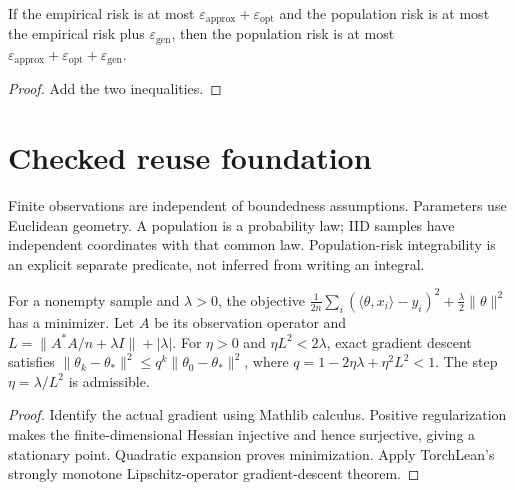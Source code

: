 \begin{lemma}\label{lem:population_risk}
\leanok
{}
If the empirical risk is at most $\varepsilon_{\mathrm{approx}}+\varepsilon_{\mathrm{opt}}$ and the population risk is at most the empirical risk plus $\varepsilon_{\mathrm{gen}}$, then the population risk is at most $\varepsilon_{\mathrm{approx}}+\varepsilon_{\mathrm{opt}}+\varepsilon_{\mathrm{gen}}$.
\end{lemma}
\begin{proof}
\leanok
Add the two inequalities.
\end{proof}

\chapter{Checked reuse foundation}

\begin{definition}\label{def:reuse_data}
\leanok
Finite observations are independent of boundedness assumptions. Parameters use
Euclidean geometry. A population is a probability law; IID samples have independent
coordinates with that common law. Population-risk integrability is an explicit
separate predicate, not inferred from writing an integral.
\end{definition}

\begin{lemma}\label{lem:reuse_ridge}
\leanok
{}
For a nonempty sample and $\lambda>0$, the objective
$\frac{1}{2n}\sum_i(\langle\theta,x_i\rangle-y_i)^2+
\frac{\lambda}{2}\|\theta\|^2$ has a minimizer. Let $A$ be its observation
operator and $L=\|A^*A/n+\lambda I\|+|\lambda|$.
For $\eta>0$ and $\eta L^2<2\lambda$, exact gradient descent satisfies
$\|\theta_k-\theta_*\|^2\leq q^k\|\theta_0-\theta_*\|^2$,
where $q=1-2\eta\lambda+\eta^2L^2<1$.
The step $\eta=\lambda/L^2$ is admissible.
\end{lemma}
\begin{proof}
\leanok
Identify the actual gradient using Mathlib calculus. Positive regularization makes
the finite-dimensional Hessian injective and hence surjective, giving a stationary
point. Quadratic expansion proves minimization. Apply TorchLean's strongly monotone
Lipschitz-operator gradient-descent theorem.
\end{proof}

